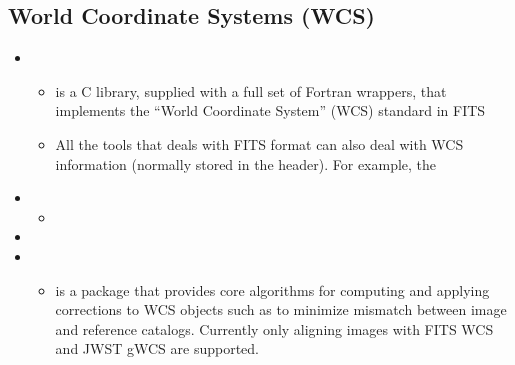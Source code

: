 \documentclass[letterpaper,10pt,english]{sphinxmanual}
\begin{document}
\subsection{World Coordinate Systems (WCS)}
\label{\detokenize{resource/astro/astro_research_basic:world-coordinate-systems-wcs}}\begin{itemize}
\item {} 
\begin{itemize}
\item {} 
is a C library, supplied with a full set of Fortran wrappers, that
implements the “World Coordinate System” (WCS) standard in FITS

\item {} 
All the tools that deals with FITS format can also deal with WCS
information (normally stored in the header). For example, the

\end{itemize}

\item {} 
\begin{itemize}
\item {} 

\end{itemize}

\item {} 

\item {} 
\begin{itemize}
\item {} 
 is a package that provides core algorithms for
computing and applying corrections to WCS objects such as to
minimize mismatch between image and reference catalogs. Currently
only aligning images with FITS WCS and JWST gWCS are supported.

\end{itemize}

\end{itemize}
\end{document}
